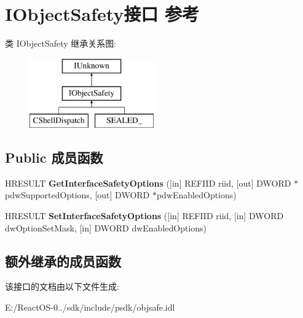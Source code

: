 \hypertarget{interface_i_object_safety}{}\section{I\+Object\+Safety接口 参考}
\label{interface_i_object_safety}
类 I\+Object\+Safety 继承关系图\+:\begin{figure}[H]
\begin{center}
\leavevmode
\includegraphics[height=3.000000cm]{interface_i_object_safety}
\end{center}
\end{figure}
\subsection*{Public 成员函数}
\begin{DoxyCompactItemize}
\item 
\mbox{\label{interface_i_object_safety_ab8ff8c9b6817a02d20e32333c405dbe9}} 
H\+R\+E\+S\+U\+LT {\bfseries Get\+Interface\+Safety\+Options} (\mbox{[}in\mbox{]} R\+E\+F\+I\+ID riid, \mbox{[}out\mbox{]} D\+W\+O\+RD $\ast$pdw\+Supported\+Options, \mbox{[}out\mbox{]} D\+W\+O\+RD $\ast$pdw\+Enabled\+Options)
\item 
\mbox{\label{interface_i_object_safety_ad7466221a65c2e1bc30dca0729604be6}} 
H\+R\+E\+S\+U\+LT {\bfseries Set\+Interface\+Safety\+Options} (\mbox{[}in\mbox{]} R\+E\+F\+I\+ID riid, \mbox{[}in\mbox{]} D\+W\+O\+RD dw\+Option\+Set\+Mask, \mbox{[}in\mbox{]} D\+W\+O\+RD dw\+Enabled\+Options)
\end{DoxyCompactItemize}
\subsection*{额外继承的成员函数}


该接口的文档由以下文件生成\+:\begin{DoxyCompactItemize}
\item 
E\+:/\+React\+O\+S-\/0../sdk/include/psdk/objsafe.\+idl\end{DoxyCompactItemize}
